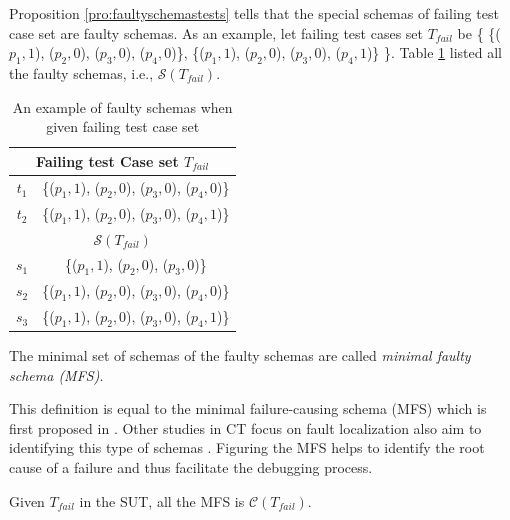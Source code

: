 Proposition \ref{pro:faultyschemastests} tells that the special schemas of failing test case set are faulty schemas. As an example, let failing test cases set $T_{fail}$ be \{ \{($p_{1}, 1$), ($p_{2}, 0$), ($p_{3}, 0$), ($p_{4}, 0$)\}, \{($p_{1}, 1$), ($p_{2}, 0$), ($p_{3}, 0$), ($p_{4}, 1$)\} \}. Table \ref{ex:faultyschemaspffailingtestset} listed all the faulty schemas, i.e., $\mathcal{S}(T_{fail})$.


\begin{table}[htbp]
  \centering
  \caption{An example of faulty schemas when given failing test case set}
      \label{ex:faultyschemaspffailingtestset}
    \begin{tabular}{|c|c|} \hline
  \multicolumn{2}{|c|}{\textbf{Failing test Case set $T_{fail}$}} \\ \hline
  $t_{1}$ & \{($p_{1}, 1$), ($p_{2}, 0$), ($p_{3}, 0$), ($p_{4}, 0$)\}\\
  $t_{2}$ & \{($p_{1}, 1$), ($p_{2}, 0$), ($p_{3}, 0$), ($p_{4}, 1$)\}\\ \hline
  \multicolumn{2}{|c|}{\textbf{ $\mathcal{S}(T_{fail})$ }}  \\ \hline
  $s_{1}$ & \{($p_{1}, 1$), ($p_{2}, 0$), ($p_{3}, 0$)\}  \\
  $s_{2}$ & \{($p_{1}, 1$), ($p_{2}, 0$), ($p_{3}, 0$), ($p_{4}, 0$)\} \\
  $s_{3}$ & \{($p_{1}, 1$), ($p_{2}, 0$), ($p_{3}, 0$), ($p_{4}, 1$)\} \\ \hline
    \end{tabular}%
\end{table}%


\begin{definition} \label{de:faulty:minimal}
The minimal set of schemas of the faulty schemas are called \emph{minimal faulty schema (MFS)}.
\end{definition}

This definition is equal to the minimal failure-causing schema (MFS) which is first proposed in \cite{nie2011minimal}. Other studies in CT focus on fault localization also aim to identifying this type of schemas \cite{nie2011minimal,zhang2011characterizing,ghandehari2012identifying,niu2013identifying}. Figuring the MFS helps to identify the root cause of a failure and thus facilitate the debugging process.


\begin{proposition}\label{pro:minmalfaultyschemastests}
Given  $T_{fail}$ in the SUT, all the MFS is $\mathcal{C}(T_{fail})$.
\end{proposition}

